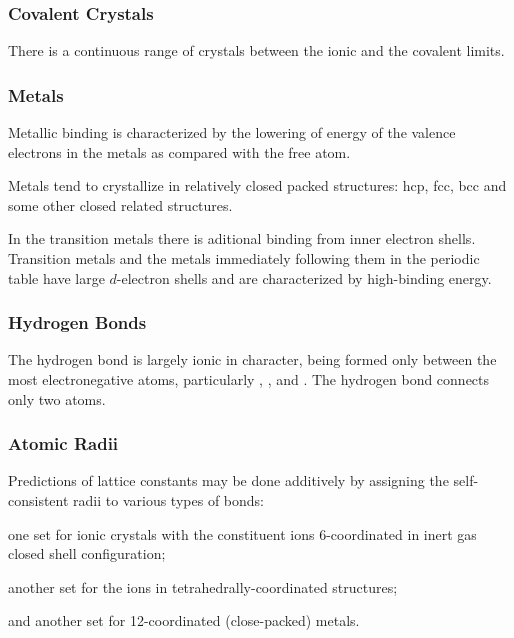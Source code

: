 \documentclass[hidelinks]{article}
\begin{document}

\subsubsection{Covalent Crystals} %
\label{ssub:covalent_crystals}

There is a continuous range of crystals between the ionic and the covalent limits.


\subsubsection{Metals} %
\label{ssub:metals}

Metallic binding is characterized by the lowering of energy of the valence electrons in the metals as compared with the free atom.
\par
Metals tend to crystallize in relatively closed packed structures: hcp, fcc, bcc and some other closed related structures.
\par
In the transition metals there is aditional binding from inner electron shells. Transition metals and the metals immediately following them in the periodic table have large $d$-electron shells and are characterized by high-binding energy.


\subsubsection{Hydrogen Bonds} %
\label{ssub:hydrogen_bonds}

The hydrogen bond is largely ionic in character, being formed only between the most electronegative atoms, particularly , , and . The hydrogen bond connects only two atoms.


\subsubsection{Atomic Radii} %
\label{ssub:atomic_radii}

Predictions of lattice constants may be done additively by assigning the self-consistent radii to various types of bonds:
\begin{cenum}
    \item one set for ionic crystals with the constituent ions 6-coordinated in inert gas closed shell configuration;
    \item another set for the ions in tetrahedrally-coordinated structures;
    \item and another set for 12-coordinated (close-packed) metals.
\end{cenum}
\end{document}
